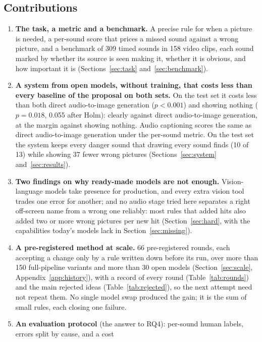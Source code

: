 \subsection{Contributions}
\begin{enumerate}
  \item \textbf{The task, a metric and a benchmark.} A precise rule for when a picture is needed, a per-sound score
        that prices a missed sound against a wrong picture, and a benchmark of 309 timed sounds in 158 video clips,
        each sound marked by whether its source is seen making it, whether it is obvious, and how important it is (Sections~\ref{sec:task}
        and~\ref{sec:benchmark}).
  \item \textbf{A system from open models, without training, that costs less than every baseline of the proposal on both sets.} On
        the test set it costs less than both direct audio-to-image generation ($p < 0.001$) and showing nothing
        ($p = 0.018$, 0.055 after Holm): clearly against direct audio-to-image generation, at the margin against
        showing nothing. Audio captioning scores the same as direct audio-to-image generation under the per-sound metric. On the
        test set the system keeps every danger sound that drawing every sound finds (10 of 13) while showing 37 fewer wrong pictures
        (Sections~\ref{sec:system} and~\ref{sec:results}).
  \item \textbf{Two findings on why ready-made models are not enough.} Vision-language models take presence for
        production, and every extra vision tool trades one error for another; and no audio stage tried here separates
        a right off-screen name from a wrong one reliably: most rules that added hits also added two or more wrong pictures per new hit
        (Section~\ref{sec:hard}, with the capabilities today's models lack in Section~\ref{sec:missing}).
  \item \textbf{A pre-registered method at scale.} 66 pre-registered rounds, each accepting a change only by a rule
        written down before its run, over more than 150 full-pipeline variants and more than 30 open models
        (Section~\ref{sec:scale}, Appendix~\ref{app:history}), with a record of every round (Table~\ref{tab:rounds}) and the main rejected ideas
        (Table~\ref{tab:rejected}), so the next attempt need not repeat them. No single model swap produced the gain;
        it is the sum of small rules, each closing one failure.
  \item \textbf{An evaluation protocol} (the answer to RQ4): per-sound human labels, errors split by cause, and a cost

\end{enumerate}

